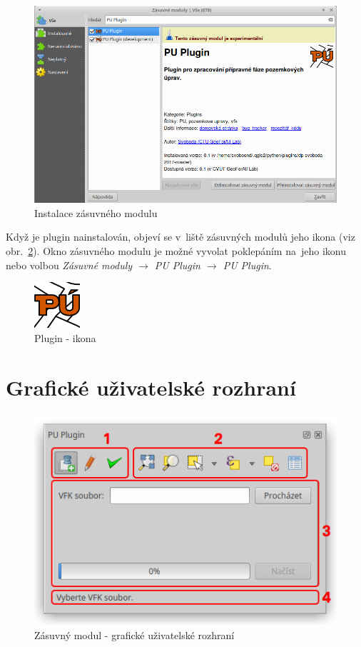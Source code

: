 	\begin{figure}[H]
		\centering
		\includegraphics[width=.8\textwidth]{./pictures/instalace_puplugin.png}
		\caption[Instalace zásuvného modulu]{Instalace zásuvného modulu}
		\label{fig:instalace_puplugin}
 	\end{figure}

Když je plugin nainstalován, objeví se v~liště zásuvných modulů jeho ikona (viz obr.~\ref{fig:ikona_puplugin}). Okno zásuvného modulu je možné vyvolat poklepáním na~jeho ikonu nebo volbou \textit{Zásuvné moduly $\rightarrow$ PU Plugin $\rightarrow$ PU Plugin}.

	\begin{figure}[H]
		\centering
		\includegraphics[width=.1\textwidth]{./pictures/puplugin.png}
		\caption[Plugin - ikona]{Plugin - ikona}
		\label{fig:ikona_puplugin}
 	\end{figure}

\section{Grafické uživatelské rozhraní}
\label{manual_gui}

	\begin{figure}[H]
		\centering
		\includegraphics[width=.55\textwidth]{./pictures/main_gui.png}
		\caption[Zásuvný modul - grafické uživatelské rozhraní]{Zásuvný modul - grafické uživatelské rozhraní}
		\label{fig:manual_main_gui}
 	\end{figure}

